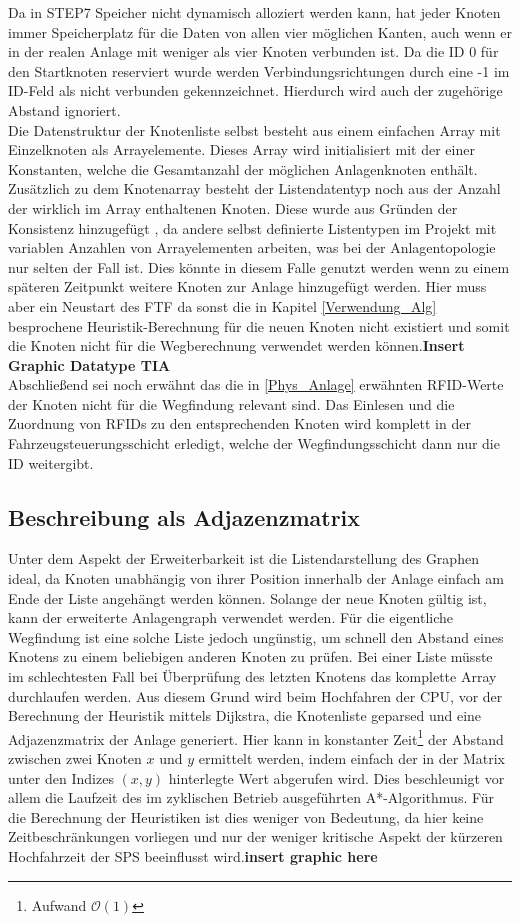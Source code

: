 			Da in \ac{STEP7} Speicher nicht dynamisch alloziert werden kann, hat jeder Knoten immer Speicherplatz für die Daten von allen vier möglichen Kanten, auch wenn er in der realen Anlage mit weniger als vier Knoten verbunden ist. Da die ID 0 für den Startknoten reserviert wurde werden Verbindungsrichtungen durch eine -1 im ID-Feld als nicht verbunden gekennzeichnet. Hierdurch wird auch der zugehörige Abstand ignoriert.\\
			Die Datenstruktur der Knotenliste selbst besteht aus einem einfachen Array mit Einzelknoten als Arrayelemente. Dieses Array wird initialisiert mit der einer Konstanten, welche die Gesamtanzahl der möglichen Anlagenknoten enthält. Zusätzlich zu dem Knotenarray besteht der Listendatentyp noch aus der Anzahl der wirklich im Array enthaltenen Knoten. Diese wurde aus Gründen der Konsistenz hinzugefügt , da andere selbst definierte Listentypen im Projekt mit variablen Anzahlen von Arrayelementen arbeiten, was bei der Anlagentopologie nur selten der Fall ist. Dies könnte in diesem Falle genutzt werden wenn zu einem späteren Zeitpunkt weitere Knoten zur Anlage hinzugefügt werden. Hier muss aber ein Neustart des \ac{FTF} da sonst die in Kapitel \ref{Verwendung_Alg} besprochene Heuristik-Berechnung für die neuen Knoten nicht existiert und somit die Knoten nicht für die Wegberechnung verwendet werden können.\textbf{Insert Graphic Datatype TIA}\\
			Abschließend sei noch erwähnt das die in \ref{Phys_Anlage} erwähnten \ac{RFID}-Werte der Knoten nicht für die Wegfindung relevant sind. Das Einlesen und die Zuordnung von \ac{RFID}s zu den entsprechenden Knoten wird komplett in der Fahrzeugsteuerungsschicht erledigt, welche der Wegfindungsschicht dann nur die ID weitergibt.
			
		\subsection{Beschreibung als Adjazenzmatrix}
		
			Unter dem Aspekt der Erweiterbarkeit ist die Listendarstellung des Graphen ideal, da Knoten unabhängig von ihrer Position innerhalb der Anlage einfach am Ende der Liste angehängt werden können. Solange der neue Knoten gültig ist, kann der erweiterte Anlagengraph verwendet werden. Für die eigentliche Wegfindung ist eine solche Liste jedoch ungünstig, um schnell den Abstand eines Knotens zu einem beliebigen anderen Knoten zu prüfen. Bei einer Liste müsste im schlechtesten Fall bei Überprüfung des letzten Knotens das komplette Array durchlaufen werden. Aus diesem Grund wird beim Hochfahren der CPU, vor der Berechnung der Heuristik mittels Dijkstra, die Knotenliste geparsed und eine Adjazenzmatrix der Anlage generiert. Hier kann in konstanter Zeit\footnote{Aufwand $\mathcal{O}(1)$} der Abstand zwischen zwei Knoten $x$ und $y$ ermittelt werden, indem einfach der in der Matrix unter den Indizes $(x,y)$ hinterlegte Wert abgerufen wird. Dies beschleunigt vor allem die Laufzeit des im zyklischen Betrieb ausgeführten A*-Algorithmus. Für die Berechnung der Heuristiken ist dies weniger von Bedeutung, da hier keine Zeitbeschränkungen vorliegen und nur der weniger kritische Aspekt der kürzeren Hochfahrzeit der \ac{SPS} beeinflusst wird.\textbf{insert graphic here}

